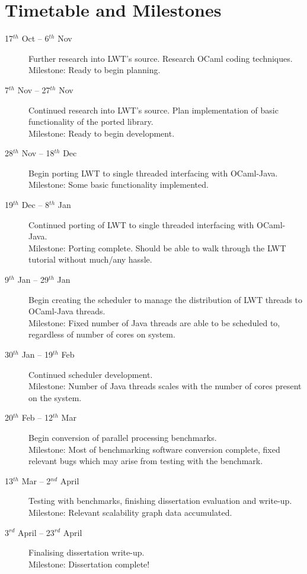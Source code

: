 \documentclass[a4paper]{article}
\begin{document}
\section{Timetable and Milestones}
\label{sec:timetable}

\begin{description}
\item[17$^{th}$ Oct -- 6$^{th}$ Nov] Further research into LWT's source. Research OCaml coding techniques.\\
Milestone: Ready to begin planning.

\item[7$^{th}$ Nov -- 27$^{th}$ Nov]
Continued research into LWT's source. Plan implementation of basic functionality of the ported library.\\
Milestone: Ready to begin development.

\item[28$^{th}$ Nov -- 18$^{th}$ Dec] Begin porting LWT to single threaded interfacing with OCaml-Java.\\
Milestone: Some basic functionality implemented.

\item[19$^{th}$ Dec -- 8$^{th}$ Jan] Continued porting of LWT to single threaded interfacing with OCaml-Java.\\
Milestone: Porting complete. Should be able to walk through the LWT tutorial without much/any hassle.

\item[9$^{th}$ Jan -- 29$^{th}$ Jan] Begin creating the scheduler to manage the distribution of LWT threads to OCaml-Java threads.\\
Milestone: Fixed number of Java threads are able to be scheduled to, regardless of number of cores on system.

\item[30$^{th}$ Jan -- 19$^{th}$ Feb] Continued scheduler development.\\
Milestone: Number of Java threads scales with the number of cores present on the system.

\item[20$^{th}$ Feb -- 12$^{th}$ Mar] Begin conversion of parallel processing benchmarks.\\
Milestone: Most of benchmarking software conversion complete, fixed relevant bugs which may arise from testing with the benchmark.

\item[13$^{th}$ Mar -- 2$^{nd}$ April] Testing with benchmarks, finishing dissertation evaluation and write-up.\\
Milestone: Relevant scalability graph data accumulated.

\item[3$^{rd}$ April -- 23$^{rd}$ April] Finalising dissertation write-up.\\
Milestone: Dissertation complete!

\end{description}
\end{document}
